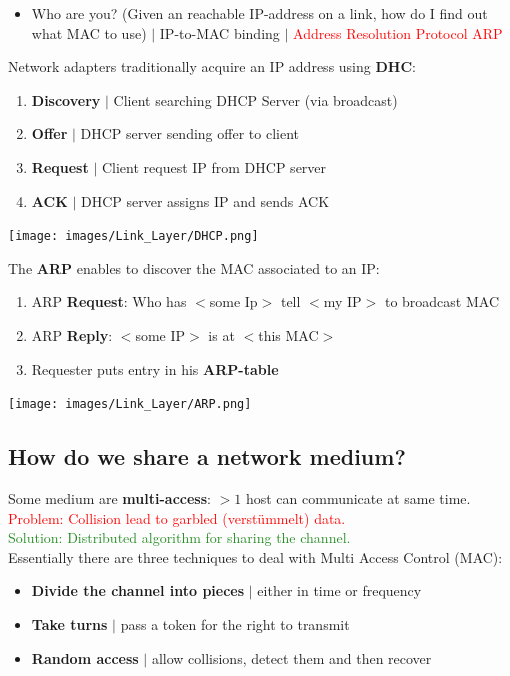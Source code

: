 \documentclass[a4paper, fontsize=8pt, landscape, DIV=1]{scrartcl}
\begin{document}
\begin{multicols*}{4}
\begin{itemize}[noitemsep]
   				\item Who are you? (Given an reachable IP-address on a link, how do I find out what MAC to use) $\vert$ IP-to-MAC binding $\vert$ \textcolor{Red}{Address Resolution Protocol ARP}
   			\end{itemize}
   			Network adapters traditionally acquire an IP address using \textbf{DHC}:
   			\begin{enumerate}[noitemsep]
   				\item \textbf{Discovery} $\vert$ Client searching DHCP Server (via broadcast)
   				\item \textbf{Offer} $\vert$ DHCP server sending offer to client
   				\item \textbf{Request} $\vert$ Client request IP from DHCP server
   				\item \textbf{ACK} $\vert$ DHCP server assigns IP and sends ACK 
   			\end{enumerate}
   			\texttt{[image: images/Link\_Layer/DHCP.png]}
   			\par 
   			
   			The \textbf{ARP} enables to discover the MAC associated to an IP: 
   			\begin{enumerate}[noitemsep]
   				\item ARP \textbf{Request}: Who has $<$some Ip$>$ tell $<$my IP$>$ to broadcast MAC
   				\item ARP \textbf{Reply}: $<$some IP$>$ is at $<$this MAC$>$
   				\item Requester puts entry in his \textbf{ARP-table}
   			\end{enumerate}
   			\texttt{[image: images/Link\_Layer/ARP.png]}
   			
   			\subsection{How do we share a network medium?}
   			Some medium are \textbf{multi-access}: $>1$ host can communicate at same time.\\
   			\textcolor{Red}{Problem: Collision lead to garbled (verstümmelt) data.}\\
   			\textcolor{ForestGreen}{Solution: Distributed algorithm for sharing the channel.}\\
   			Essentially there are three techniques to deal with Multi Access Control (MAC):
   			\begin{itemize}[noitemsep]
   				\item \textbf{Divide the channel into pieces} $\vert$ either in time or frequency
   				\item \textbf{Take turns} $\vert$ pass a token for the right to transmit
   				\item \textbf{Random access} $\vert$ allow collisions, detect them and then recover
   			\end{itemize} 
   			

\end{multicols*}
\end{document}
